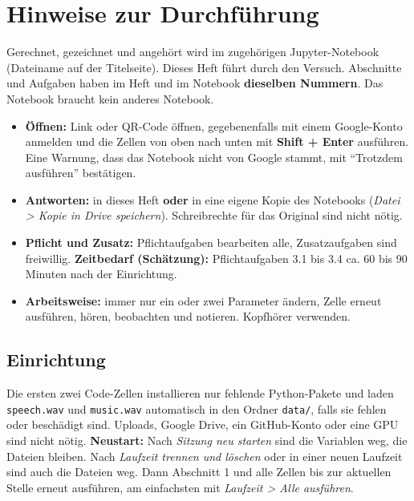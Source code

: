 \documentclass[11pt]{article}
\begin{document}

\section{Hinweise zur Durchführung}

Gerechnet, gezeichnet und angehört wird im zugehörigen Jupyter-Notebook (Dateiname auf der Titelseite). Dieses Heft führt durch den Versuch. Abschnitte und Aufgaben haben im Heft und im Notebook \textbf{dieselben Nummern}. Das Notebook braucht kein anderes Notebook.


\begin{itemize}
  \item \textbf{Öffnen:} Link oder QR-Code öffnen, gegebenenfalls mit einem Google-Konto anmelden und die Zellen von oben nach unten mit \textbf{Shift + Enter} ausführen. Eine Warnung, dass das Notebook nicht von Google stammt, mit "`Trotzdem ausführen"' bestätigen.
  \item \textbf{Antworten:} in dieses Heft \textbf{oder} in eine eigene Kopie des Notebooks (\textit{Datei > Kopie in Drive speichern}). Schreibrechte für das Original sind nicht nötig.
  \item \textbf{Pflicht und Zusatz:} Pflichtaufgaben bearbeiten alle, Zusatzaufgaben sind freiwillig. \textbf{Zeitbedarf (Schätzung):} Pflichtaufgaben 3.1 bis 3.4 ca. 60 bis 90 Minuten nach der Einrichtung.
  \item \textbf{Arbeitsweise:} immer nur ein oder zwei Parameter ändern, Zelle erneut ausführen, hören, beobachten und notieren. Kopfhörer verwenden.
\end{itemize}

\subsection{Einrichtung}

Die ersten zwei Code-Zellen installieren nur fehlende Python-Pakete und laden \texttt{speech.wav} und \texttt{music.wav} automatisch in den Ordner \texttt{data/}, falls sie fehlen oder beschädigt sind. Uploads, Google Drive, ein GitHub-Konto oder eine GPU sind nicht nötig. \textbf{Neustart:} Nach \textit{Sitzung neu starten} sind die Variablen weg, die Dateien bleiben. Nach \textit{Laufzeit trennen und löschen} oder in einer neuen Laufzeit sind auch die Dateien weg. Dann Abschnitt 1 und alle Zellen bis zur aktuellen Stelle erneut ausführen, am einfachsten mit \textit{Laufzeit > Alle ausführen}.
\end{document}
